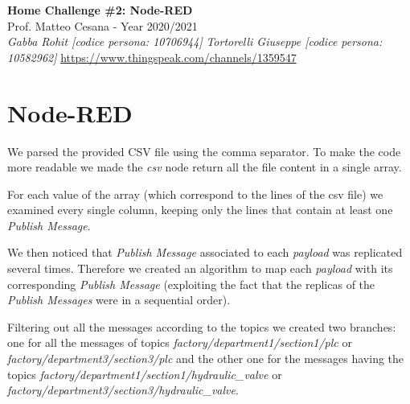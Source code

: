 \documentclass{article}
\begin{document}
\begin{titlepage}
   \begin{center}
      \Huge\textbf{Home Challenge \#2: Node-RED}\\
      \vspace{5mm} %
      \Large Prof. Matteo Cesana - Year 2020/2021\\
      \vspace{5mm} %
      \large\textit{Gabba Rohit [codice persona: 10706944]}
      \linebreak
      \large\textit{Tortorelli Giuseppe [codice persona: 10582962]}
      \linebreak
      \linebreak
      \linebreak
      \href{https://www.thingspeak.com/channels/1359547}{https://www.thingspeak.com/channels/1359547}
      \linebreak
   \end{center}
\end{titlepage}

\pagebreak
\section{Node-RED}
We parsed the provided CSV file using the comma separator. To make the code more readable we made the \textit{csv} node return all the file content in a single array.\hfill \break 

For each value of the array (which correspond to the lines of the csv file) we examined every single column, keeping only the lines that contain at least one \textit{Publish Message}. \hfill \break

We then noticed that \textit{Publish Message} associated to each \textit{payload} was replicated several times. Therefore we created an algorithm to map each \textit{payload} with its corresponding \textit{Publish Message} (exploiting the fact that the replicas of the \textit{Publish Messages} were in a sequential order). \hfill \break 

Filtering out all the messages according to the topics we created two branches: one for all the messages of topics \textit{factory/department1/section1/plc} or \textit{factory/department3/section3/plc} and the other one for the messages having the topics \textit{factory/department1/section1/hydraulic\_valve} or \textit{factory/department3/section3/hydraulic\_valve}. \hfill \break 
\end{document}
